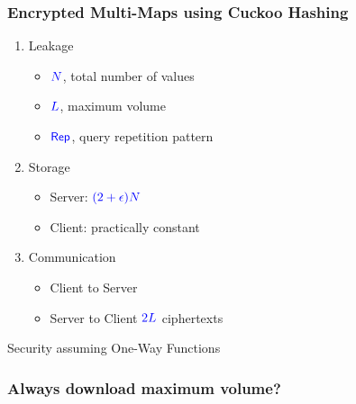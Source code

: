 \documentclass[]{beamer}
\newcommand{\LMax}{\ell_{\text{max}}}
\begin{document}
\begin{frame}
\frametitle{Encrypted Multi-Maps using Cuckoo Hashing}

\begin{enumerate}
\item Leakage
    \begin{itemize}
            \item $\color{blue} N$, total number of values
            \item $\color{blue} L$, maximum volume
            \item $\mathsf{\color{blue} Rep}$, query repetition pattern
    \end{itemize}
\item Storage
    \begin{itemize}
        \item Server: $\color{blue} (2+\epsilon)N$
        \item Client: practically constant 
    \end{itemize}
\item Communication
    \begin{itemize}
        \item Client to Server 
        \item Server to Client $\color{blue} 2L$ ciphertexts
    \end{itemize}
\end{enumerate}

Security assuming One-Way Functions

\end{frame}

\begin{frame}
\frametitle{Always download maximum volume?}

\pause
{}
\end{frame}
\end{document}
